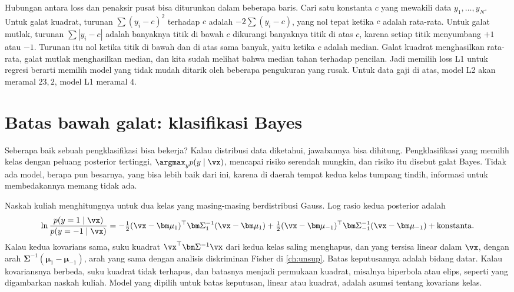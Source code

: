 Hubungan antara loss dan penaksir pusat bisa diturunkan dalam beberapa baris. Cari satu konstanta $c$ yang mewakili data
$y_1,\dots,y_N$. Untuk galat kuadrat, turunan $\sum(y_i-c)^2$ terhadap $c$ adalah $-2\sum(y_i-c)$, yang nol tepat ketika $c$
adalah rata-rata. Untuk galat mutlak, turunan $\sum|y_i-c|$ adalah banyaknya titik di bawah $c$ dikurangi banyaknya titik di
atas $c$, karena setiap titik menyumbang $+1$ atau $-1$. Turunan itu nol ketika titik di bawah dan di atas sama banyak, yaitu
ketika $c$ adalah median. Galat kuadrat menghasilkan rata-rata, galat mutlak menghasilkan median, dan kita sudah melihat
bahwa median tahan terhadap pencilan. Jadi memilih loss L1 untuk regresi berarti memilih model yang tidak mudah ditarik oleh
beberapa pengukuran yang rusak. Untuk data gaji di atas, model L2 akan meramal $23{,}2$, model L1 meramal $4$.

\section{Batas bawah galat: klasifikasi Bayes}

Seberapa baik sebuah pengklasifikasi bisa bekerja? Kalau distribusi data diketahui, jawabannya bisa dihitung. Pengklasifikasi
yang memilih kelas dengan peluang posterior tertinggi, $\argmax_yp(y\mid\vx)$, mencapai risiko serendah mungkin, dan risiko itu
disebut galat Bayes. Tidak ada model, berapa pun besarnya, yang bisa lebih baik dari ini, karena di daerah tempat kedua kelas
tumpang tindih, informasi untuk membedakannya memang tidak ada.

Naskah kuliah menghitungnya untuk dua kelas yang masing-masing berdistribusi Gauss. Log rasio kedua posterior adalah
\begin{equation}
\ln\frac{p(y=1\mid\vx)}{p(y=-1\mid\vx)}=
-\tfrac12(\vx-\bm\mu_1)^\top\bm\Sigma_1^{-1}(\vx-\bm\mu_1)+\tfrac12(\vx-\bm\mu_{-1})^\top\bm\Sigma_{-1}^{-1}(\vx-\bm\mu_{-1})
+\text{konstanta}.
\end{equation}
Kalau kedua kovarians sama, suku kuadrat $\vx^\top\bm\Sigma^{-1}\vx$ dari kedua kelas saling menghapus, dan yang tersisa linear
dalam $\vx$, dengan arah $\bm\Sigma^{-1}(\bm\mu_1-\bm\mu_{-1})$, arah yang sama dengan analisis diskriminan Fisher di
\cref{ch:unsup}. Batas keputusannya adalah bidang datar. Kalau kovariansnya berbeda, suku kuadrat tidak terhapus, dan batasnya
menjadi permukaan kuadrat, misalnya hiperbola atau elips, seperti yang digambarkan naskah kuliah. Model yang dipilih untuk
batas keputusan, linear atau kuadrat, adalah asumsi tentang kovarians kelas.

